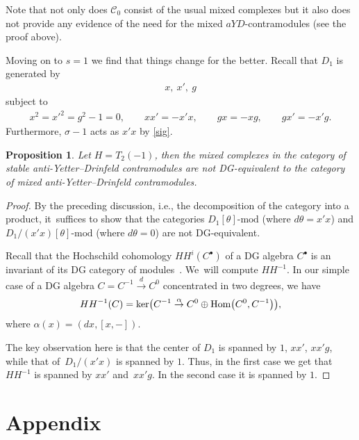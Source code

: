 \documentclass[pdftex]{sigma}
\numberwithin{equation}{section}
\newtheorem{Proposition}[Theorem]{Proposition}
\newcommand{\Cc}{\mathcal{C}}
\begin{document}
 \begin{Remark}
 Note that not only does $\Cc_0$ consist of the usual mixed complexes but it also does not provide any evidence of the need for the mixed $aYD$-contramodules (see the proof above).
 \end{Remark}

Moving on to $s=1$ we find that things change for the better. Recall that $D_1$ is generated by
\begin{gather}
x,\ x',\ g
\end{gather}
subject to
\begin{gather}
x^2=x'^2=g^2-1=0, \qquad
xx'=-x'x, \qquad
gx=-xg, \qquad
gx'=-x'g.
\end{gather}
Furthermore, $\sigma-1$ acts as $x'x$ by \eqref{sig}.

\begin{Proposition}\label{notsscase}
Let $H=T_2(-1)$, then the mixed complexes in the category of stable anti-Yetter--Drinfeld contramodules are not DG-equivalent to the category of mixed anti-Yetter--Drinfeld contramodules.
\end{Proposition}
\begin{proof}
By the preceding discussion, i.e., the decomposition of the category into a product, it~suf\-fices to show that the categories $D_1[\theta]\text{-mod}$ (where $d\theta=x'x$) and $D_1/(x'x)[\theta]\text{-mod}$ (where $d\theta =0$) are not DG-equivalent.

Recall that the Hochschild cohomology $HH^i(C^\bullet)$ of a DG algebra $C^\bullet$ is an invariant of its DG category of modules~\cite{dginvar}. We~will compute $HH^{-1}$. In our simple case of a DG algebra $C=C^{-1}\stackrel{d}{\to} C^0$ concentrated in two degrees, we have
\begin{gather}
HH^{-1}(C)={\rm ker} \big(C^{-1}\stackrel{\alpha}{\to} C^0\oplus {\rm Hom}\big(C^0, C^{-1}\big)\big),
\end{gather}
where $\alpha(x)=(dx, [x,-])$.

The key observation here is that the center of $D_1$ is spanned by $1$, $xx'$, $xx'g$, while that of~$D_1/(x'x)$ is spanned by $1$. Thus, in the first case we get that $HH^{-1}$ is spanned by $xx'$ and~$xx'g$. In the second case it is spanned by $1$.
\end{proof}

\appendix

\section{Appendix}\label{appx}
\end{document}
